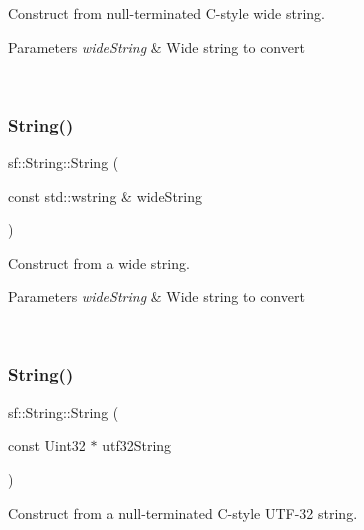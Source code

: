 Construct from null-\/terminated C-\/style wide string. 


\begin{DoxyParams}{Parameters}
{\em wide\+String} & Wide string to convert \begin{DoxyVerb}\end{DoxyVerb}
 \\
\hline
\end{DoxyParams}
\mbox{\label{classsf_1_1_string_a5e38151340af4f9a5f74ad24c0664074}} 
\subsubsection{\texorpdfstring{String()}{String()}\hspace{0.1cm}{\footnotesize\ttfamily [8/11]}}
{\footnotesize\ttfamily sf\+::\+String\+::\+String (\begin{DoxyParamCaption}\item[{const std\+::wstring \&}]{wide\+String }\end{DoxyParamCaption})}



Construct from a wide string. 


\begin{DoxyParams}{Parameters}
{\em wide\+String} & Wide string to convert \begin{DoxyVerb}\end{DoxyVerb}
 \\
\hline
\end{DoxyParams}
\mbox{\label{classsf_1_1_string_aea3629adf19f9fe713d4946f6c75b214}} 
\subsubsection{\texorpdfstring{String()}{String()}\hspace{0.1cm}{\footnotesize\ttfamily [9/11]}}
{\footnotesize\ttfamily sf\+::\+String\+::\+String (\begin{DoxyParamCaption}\item[{const Uint32 $\ast$}]{utf32\+String }\end{DoxyParamCaption})}



Construct from a null-\/terminated C-\/style U\+T\+F-\/32 string. 


